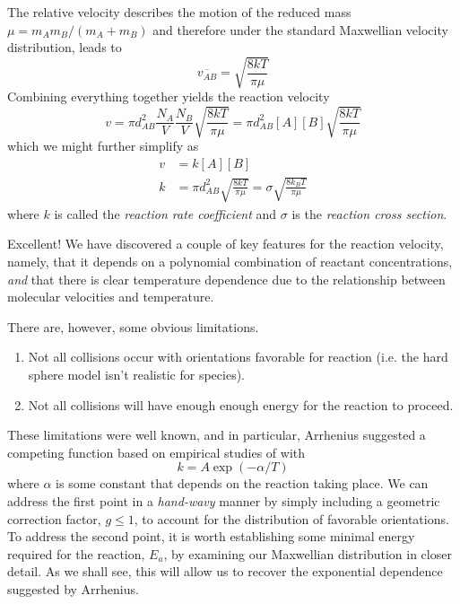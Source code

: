 The relative velocity describes the motion of the reduced mass $\mu=m_{A}m_{B}/(m_{A}+m_{B})$ and therefore under the standard Maxwellian velocity distribution, leads to
\begin{equation}
  \overline{v_{AB}} = \sqrt{\frac{8kT}{\pi \mu}}
\end{equation}
Combining everything together yields the reaction velocity
\begin{equation}
  v = \pi d_{AB}^2\frac{N_{A}}{V}\frac{N_{B}}{V}\sqrt{\frac{8kT}{\pi \mu}} = \pi d_{AB}^2[A][B]\sqrt{\frac{8kT}{\pi \mu}}
\end{equation}
which we might further simplify as
\begin{align}
  v &= k[A][B] \\
  k &= \pi d_{AB}^2\sqrt{\frac{8kT}{\pi \mu}} = \sigma \sqrt{\frac{8k_BT}{\pi \mu}}
\end{align}
where $k$ is called the \textit{reaction rate coefficient} and $\sigma$ is the \textit{reaction cross section}.

Excellent! We have discovered a couple of key features for the reaction velocity, namely, that it depends on a polynomial combination of reactant concentrations, \textit{and} that there is clear temperature dependence due to the relationship between molecular velocities and temperature.

There are, however, some obvious limitations.
\begin{enumerate}
  \item Not all collisions occur with orientations favorable for reaction (i.e. the hard sphere model isn't realistic for species).
  \item Not all collisions will have enough enough energy for the reaction to proceed.
\end{enumerate}
These limitations were well known, and in particular, Arrhenius suggested a competing function based on empirical studies of with
\begin{equation}
  k = A\exp(-\alpha/T)
\end{equation}
where $\alpha$ is some constant that depends on the reaction taking place. We can address the first point in a \textit{hand-wavy} manner by simply including a geometric correction factor, $g\leq 1$, to account for the distribution of favorable orientations. To address the second point, it is worth establishing some minimal energy required for the reaction, $E_a$, by examining our Maxwellian distribution in closer detail. As we shall see, this will allow us to recover the exponential dependence suggested by Arrhenius.

